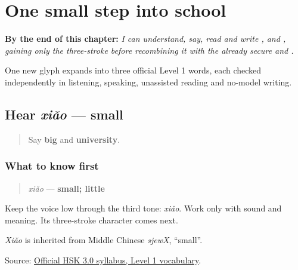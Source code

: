 
\chapter{One small step into school}
\label{ch:zh-primary-three}

\begin{chapteropening}
\textbf{By the end of this chapter:} \emph{I can understand, say, read and write ,  and , gaining only the three-stroke  before recombining it with the already secure  and .}

One new glyph expands into three official Level 1 words, each checked independently in listening, speaking, unassisted reading and no-model writing.
\end{chapteropening}

\section[xiǎo]{Hear \emph{xiǎo} — small}

\label{lesson:ZH-C14-hear-xiao}



\begin{quote}
Say \textbf{big} and \textbf{university}.
\end{quote}

\subsection*{What to know first}
\begin{quote}
\emph{xiǎo} — \textbf{small; little}
\end{quote}

Keep the voice low through the third tone: \emph{xiǎo}. Work only with sound and meaning. Its three-stroke character comes next.

\emph{Xiǎo} is inherited from Middle Chinese \emph{sjewX}, \textquotedblleft{}small\textquotedblright{}.

\begin{tcolorbox}[breakable,colback=teal!4,colframe=teal!35!black,title={Before you move on}]
Source: \href{https://hsk.cn-bj.ufileos.com/3.0/\%E6\%96\%B0\%E7\%89\%88HSK\%E8\%80\%83\%E8\%AF\%95\%E5\%A4\%A7\%E7\%BA\%B21219.pdf}{Official HSK 3.0 syllabus, Level 1 vocabulary}.
\end{tcolorbox}
